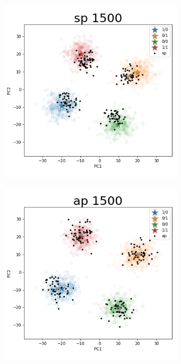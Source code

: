 \documentclass{article}
\begin{document}
\begin{figure}[p]
\begin{subfigure}{.5\textwidth}
  \centering
  \includegraphics[width=.98\linewidth]{img/ggsim1500_100000_200_2_1_100_1_sturef_ggsim1500_100000_1500_2_1_100_0_sp}
\end{subfigure}%
\begin{subfigure}{.5\textwidth}
  \centering
  \includegraphics[width=.98\linewidth]{img/ggsim1500_100000_200_2_1_100_1_sturef_ggsim1500_100000_1500_2_1_100_0_ap}

\end{subfigure}
\end{figure}
\end{document}
